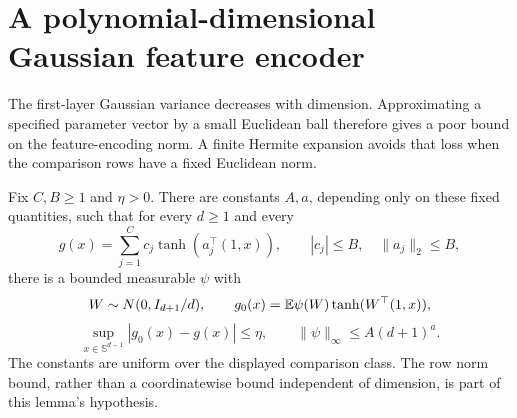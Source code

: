 \section{A polynomial-dimensional Gaussian feature encoder}
\label{sec:dimension-encoder}
The first-layer Gaussian variance decreases with dimension. Approximating a
specified parameter vector by a small Euclidean ball therefore gives a poor
bound on the feature-encoding norm. A finite Hermite expansion avoids that
loss when the comparison rows have a fixed Euclidean norm.

\begin{lemma}
\label{lem:hermite-encoder}
Fix $C,B\ge1$ and $\eta>0$. There are constants $A,a$, depending only on
these fixed quantities, such that for every $d\ge1$ and every
\[
 g(x)=\sum_{j=1}^C c_j\tanh(a_j^\top(1,x)),\qquad
 |c_j|\le B,\quad\|a_j\|_2\le B,
\]
there is a bounded measurable $\psi$ with
\[
 W\sim N(0,I_{d+1}/d),\qquad
 g_0(x)=\mathbb E\psi(W)\tanh(W^\top(1,x)),
\]
\[
 \sup_{x\in\mathbb S^{d-1}}|g_0(x)-g(x)|\le\eta,
 \qquad \|\psi\|_\infty\le A(d+1)^a.
\]
The constants are uniform over the displayed comparison class. The row
norm bound, rather than a coordinatewise bound independent of dimension,
is part of this lemma's hypothesis.
\end{lemma}
